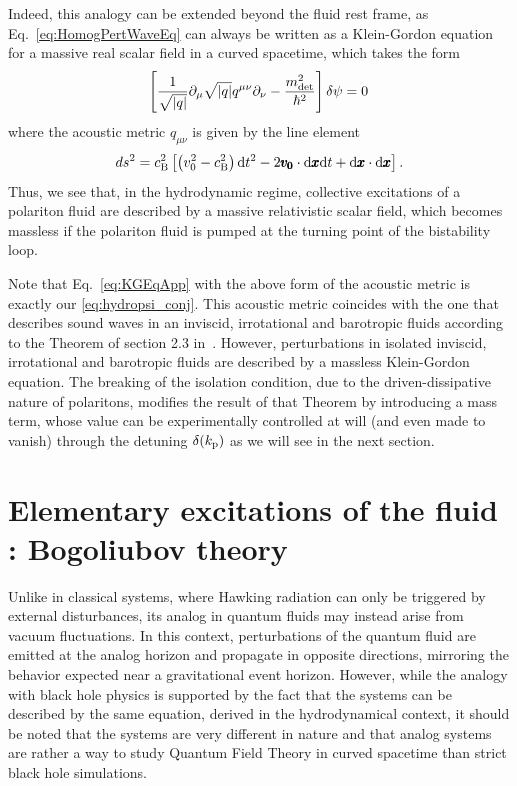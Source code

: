 Indeed, this analogy can be extended beyond the fluid rest frame, as Eq.~\eqref{eq:HomogPertWaveEq} can  always be written as a Klein-Gordon equation for a massive real scalar field in a curved spacetime, which takes the form
\begin{equation}
    \left[\frac{1}{\sqrt{|q|}}\partial_\mu\sqrt{|q|}q^{\mu\nu}\partial_\nu-\frac{m_{\rm det}^2}{\hbar^2}\right]\delta \psi=0\,
    \label{eq:KGEqApp}
\end{equation}
where the acoustic metric $q_{\mu\nu}$ is given by the line element
\begin{equation}
    ds^2=c_\mathrm{B}^{2}\left[\left( v_0^2-c_\mathrm{B}^2\right)\dd t^2-2 \pmb{v_0}\cdot\dd \pmb{x} \dd t + \dd\pmb{x}\cdot\dd\pmb{x}\right].
\end{equation}
Thus, we see that, in the hydrodynamic regime, collective excitations of a polariton fluid are described by a massive relativistic scalar field, which becomes massless if the polariton fluid is pumped at the turning point of the bistability loop.


Note that Eq.~\eqref{eq:KGEqApp} with the above form of the acoustic metric is exactly our \autoref{eq:hydropsi_conj}.
This acoustic metric coincides with the one that describes sound waves in an inviscid, irrotational and barotropic fluids according to the Theorem of section 2.3 in~\cite{barcelo_analogue_2011}. However, perturbations in isolated inviscid, irrotational and barotropic fluids are described by a massless Klein-Gordon equation. The breaking of the isolation condition, due to the
driven-dissipative nature of polaritons, modifies the result of that Theorem by introducing a mass term, whose value can be experimentally controlled at will (and even made to vanish) through the detuning $\delta(k_{\mathrm{p}})$ as we will see in the next section.


\section{Elementary excitations of the fluid : Bogoliubov theory}
Unlike in classical systems, where Hawking radiation can only be triggered by external disturbances, its analog in quantum fluids may instead arise from vacuum fluctuations. In this context, perturbations of the quantum fluid are emitted at the analog horizon and propagate in opposite directions, mirroring the behavior expected near a gravitational event horizon. 
However, while the analogy with black hole physics is supported by the fact that the systems can be described by the same equation, derived in the hydrodynamical context, it should be noted that the systems are very different in nature and that analog 
systems are rather a way to study Quantum Field Theory in curved spacetime than strict black hole simulations.


